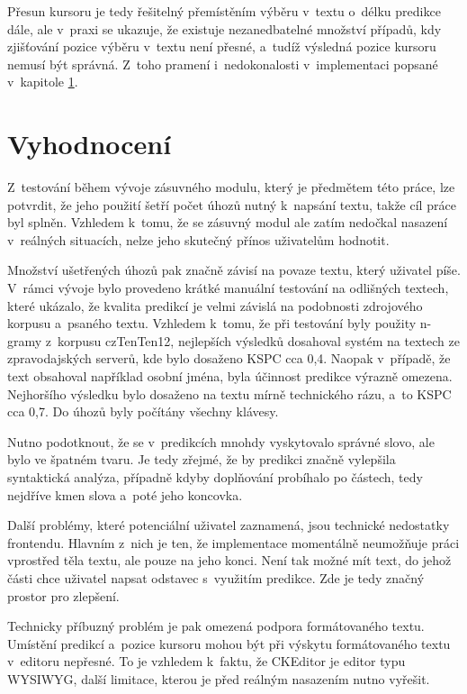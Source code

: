 \documentclass[a4paper,11pt,openany]{book} %
\begin{document}
Přesun kursoru je tedy řešitelný přemístěním výběru v~textu o~délku predikce dále, ale v~praxi se ukazuje, že existuje nezanedbatelné množství případů, kdy zjišťování pozice výběru v~textu není přesné, a~tudíž výsledná pozice kursoru nemusí být správná. Z~toho pramení i~nedokonalosti v~implementaci popsané v~kapitole \ref{vyhodnoceni}.

\chapter{Vyhodnocení}\label{vyhodnoceni}

Z~testování během vývoje zásuvného modulu, který je předmětem této práce, lze potvrdit, že jeho použití šetří počet úhozů nutný k~napsání textu, takže cíl práce byl splněn. Vzhledem k~tomu, že se zásuvný modul ale zatím nedočkal nasazení v~reálných situacích, nelze jeho skutečný přínos uživatelům hodnotit.

Množství ušetřených úhozů pak značně závisí na povaze textu, který uživatel píše. V~rámci vývoje bylo provedeno krátké manuální testování na odlišných textech, které ukázalo, že kvalita predikcí je velmi závislá na podobnosti zdrojového korpusu a~psaného textu. Vzhledem k~tomu, že při testování byly použity n-gramy z~korpusu czTenTen12, nejlepších výsledků dosahoval systém na textech ze zpravodajských serverů, kde bylo dosaženo KSPC cca 0,4. Naopak v~případě, že text obsahoval například osobní jména, byla účinnost predikce výrazně omezena. Nejhoršího výsledku bylo dosaženo na textu mírně technického rázu, a~to KSPC cca 0,7. Do úhozů byly počítány všechny klávesy.

Nutno podotknout, že se v~predikcích mnohdy vyskytovalo správné slovo, ale bylo ve špatném tvaru. Je tedy zřejmé, že by predikci značně vylepšila syntaktická analýza, případně kdyby doplňování probíhalo po částech, tedy nejdříve kmen slova a~poté jeho koncovka.

Další problémy, které potenciální uživatel zaznamená, jsou technické nedostatky frontendu. Hlavním z~nich je ten, že implementace momentálně neumožňuje práci vprostřed těla textu, ale pouze na jeho konci. Není tak možné mít text, do jehož části chce uživatel napsat odstavec s~využitím predikce. Zde je tedy značný prostor pro zlepšení.

Technicky příbuzný problém je pak omezená podpora formátovaného textu. Umístění predikcí a~pozice kursoru mohou být při výskytu formátovaného textu v~editoru nepřesné. To je vzhledem k~faktu, že CKEditor je editor typu WYSIWYG, další limitace, kterou je před reálným nasazením nutno vyřešit.
\end{document}
